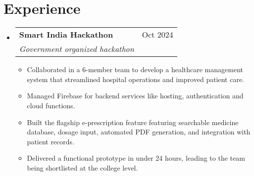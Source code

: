 \documentclass[letterpaper,11pt]{article}
\makeatletter
\newcommand{\resumeItem}[1]{
  \item\small{
    {#1 \vspace{-5pt}}
  }
}
\newcommand{\resumeSubheading}[4]{
  \vspace{-2pt}\item
    \begin{tabular*}{0.97\textwidth}[t]{l@{\extracolsep{\fill}}r}
      \textbf{#1} & #2 \\
      \textit{\small#3} & \textit{\small #4} \\
    \end{tabular*}\vspace{-7pt}
}
\newcommand{\resumeSubHeadingListStart}{\begin{itemize}[leftmargin=0.15in, label={}]}
\newcommand{\resumeSubHeadingListEnd}{\end{itemize}}
\newcommand{\resumeItemListStart}{\begin{itemize}}
\newcommand{\resumeItemListEnd}{\end{itemize}\vspace{3pt}}
\makeatother
\begin{document}
\section{Experience}
  \resumeSubHeadingListStart

\begin{comment}
    \resumeSubheading
      {Internlay}{Nov 2024}
      {College competition}{}
      \resumeItemListStart
        \resumeItem{Our team aimed to create an all-in-one solution for the management and coordination of various aspects of college sports}
        \resumeItem{Implemented user authentication, ensuring that only organization users could sign in and access the system}
        \resumeItem{Collaborated with team to implement various API routes for core functionality, such as managing sports events and scheduling}
    \resumeItemListEnd
\end{comment}

    \resumeSubheading
      {Smart India Hackathon}{Oct 2024}
      {Government organized hackathon}{}
      \resumeItemListStart
        \resumeItem{Collaborated in a 6-member team to develop a healthcare management system that streamlined hospital operations and improved patient care.}
        \resumeItem{Managed Firebase for backend services like hosting, authentication and cloud functions.}
        \resumeItem{Built the flagship e-prescription feature featuring searchable medicine database, dosage input, automated PDF generation, and integration with patient records.}
         \resumeItem{Delivered a functional prototype in under 24 hours, leading to the team being shortlisted at the college level.}
      \resumeItemListEnd

  \resumeSubHeadingListEnd


\end{document}
